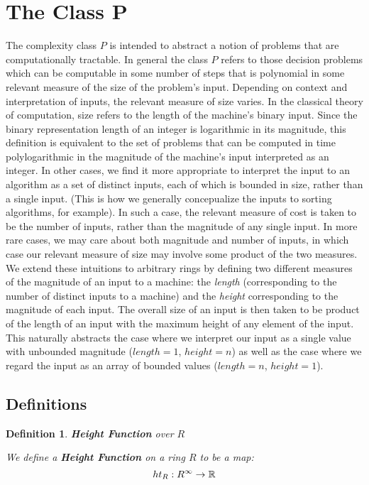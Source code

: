 \documentclass[twoside]{article}
\newtheorem{definition}{Definition}[section]
\begin{document}
\section{The Class P}

The complexity class $P$ is intended to abstract a notion of problems
that are computationally tractable.  In general the class $P$ refers
to those decision problems which can be computable in some number of
steps that is polynomial in some relevant measure of the size of the
problem's input.  Depending on context and interpretation of inputs,
the relevant measure of size varies. In the classical theory of
computation, size refers to the length of the machine's binary input.
Since the binary representation length of an integer is logarithmic in
its magnitude, this definition is equivalent to the set of problems
that can be computed in time polylogarithmic in the magnitude of the
machine's input interpreted as an integer.  In other cases, we find it
more appropriate to interpret the input to an algorithm as a set of
distinct inputs, each of which is bounded in size, rather than a
single input.  (This is how we generally concepualize the inputs to
sorting algorithms, for example).  In such a case, the relevant
measure of cost is taken to be the number of inputs, rather than the
magnitude of any single input.  In more rare cases, we may care about
both magnitude and number of inputs, in which case our relevant measure
of size may involve some product of the two measures.\\

We extend these intuitions to arbitrary rings by defining two
different measures of the magnitude of an input to a machine: the
\emph{length} (corresponding to the number of distinct inputs to a
machine) and the \emph{height} corresponding to the magnitude of each
input.  The overall size of an input is then taken to be product of
the length of an input with the maximum height of any element of the
input.  This naturally abstracts the case where we interpret our input
as a single value with unbounded magnitude ($length = 1$, $height =
n$) as well as the case where we regard the input as an array of
bounded values ($length = n$, $height = 1$).

\subsection{Definitions}

\begin{definition}{\textbf{Height Function} over $R$}

  We define a \textbf{Height Function} on a ring $R$ to be a map:
  $$ht_R:R^\infty \rightarrow \mathbb{R}$$
\end{definition}
\end{document}
